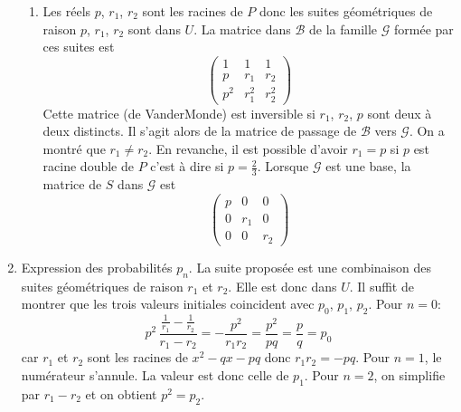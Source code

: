 \begin{enumerate}
\begin{enumerate}
 \item Les réels $p$, $r_1$, $r_2$ sont les racines de $P$ donc les suites géométriques de raison $p$, $r_1$, $r_2$ sont dans $U$. La matrice dans $\mathcal{B}$ de la famille $\mathcal{G}$ formée par ces suites est
\begin{displaymath}
 \begin{pmatrix}
1 & 1 & 1 \\ p & r_1 & r_2 \\ p^2 & r_1^2 & r_2^2
 \end{pmatrix}
\end{displaymath}
Cette matrice (de VanderMonde) est inversible si $r_1$, $r_2$, $p$ sont deux à deux distincts. Il s'agit alors de la matrice de passage de $\mathcal{B}$ vers $\mathcal{G}$. On a montré que $r_1\neq r_2$. En revanche, il est possible d'avoir $r_1=p$ si $p$ est racine double de $P$ c'est à dire si $p=\frac{2}{3}$. Lorsque $\mathcal{G}$ est une base, la matrice de $S$ dans $\mathcal{G}$ est
\begin{displaymath}
 \begin{pmatrix}
  p & 0 & 0 \\ 0 & r_1 & 0 \\ 0 & 0 & r_2
 \end{pmatrix}
\end{displaymath}

\end{enumerate} 
 
 \item Expression des probabilités $p_n$.\newline
La suite proposée est une combinaison des suites géométriques de raison $r_1$ et $r_2$. Elle est donc dans $U$. Il suffit de montrer que les trois valeurs initiales coincident avec $p_0$, $p_1$, $p_2$.\newline
Pour $n=0$:
\begin{displaymath}
 p^2\,\frac{\frac{1}{r_1} - \frac{1}{r_2}}{r_1 - r_2} = -\frac{p^2}{r_1 r_2} = \frac{p^2}{pq} = \frac{p}{q}=p_0
\end{displaymath}
car $r_1$ et $r_2$ sont les racines de $x^2-qx-pq$ donc $r_1r_2 = -pq$.\newline
Pour $n=1$, le numérateur s'annule. La valeur est donc celle de $p_1$.\newline
Pour $n=2$, on simplifie par $r_1 -r_2$ et on obtient $p^2 = p_2$.



\end{enumerate}
